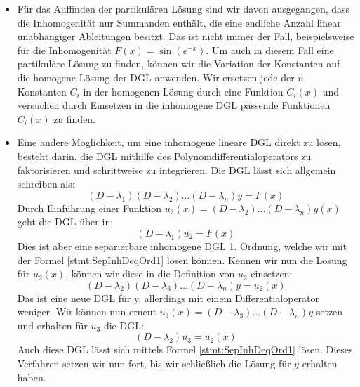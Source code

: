 \begin{itemize}
    \item Für das Auffinden der partikulären Lösung sind wir davon ausgegangen, dass die Inhomogenität nur Summanden enthält, die eine endliche Anzahl linear unabhängiger Ableitungen besitzt. Das ist nicht immer der Fall, beispielsweise für die Inhomogenität $F(x) = \sin(e^{-x})$. Um auch in diesem Fall eine partikuläre Lösung zu finden, können wir die Variation der Konstanten auf die homogene Lösung der DGL anwenden. Wir ersetzen jede der $n$ Konstanten $C_i$ in der homogenen Lösung durch eine Funktion $C_i(x)$ und versuchen durch Einsetzen in die inhomogene DGL passende Funktionen $C_i(x)$ zu finden.
    \item Eine andere Möglichkeit, um eine inhomogene lineare DGL direkt zu lösen, besteht darin, die DGL mithilfe des Polynomdifferentialoperators zu faktorisieren und schrittweise zu integrieren. Die DGL lässt sich allgemein schreiben als:
    $$
        (D-\lambda_1) (D-\lambda_2) \dots (D-\lambda_n) y = F(x)
    $$
    Durch Einführung einer Funktion $u_2(x) = (D-\lambda_2) \dots (D-\lambda_n) y(x)$ geht die DGL über in:
    $$
        (D-\lambda_1) u_2 = F(x)
    $$
    Dies ist aber eine separierbare inhomogene DGL 1. Ordnung, welche wir mit der Formel \ref{stmt:SepInhDeqOrd1} lösen können. Kennen wir nun die Lösung für $u_2(x)$, können wir diese in die Definition von $u_2$ einsetzen:
    $$
        (D-\lambda_2) (D-\lambda_3) \dots (D-\lambda_n) y = u_2(x)
    $$
    Das ist eine neue DGL für y, allerdings mit einem Differentialoperator weniger. Wir können nun erneut $u_3(x) = (D-\lambda_3) \dots (D-\lambda_n) y$ setzen und erhalten für $u_3$ die DGL:
    $$
        (D-\lambda_2) u_3 = u_2(x)
    $$
    Auch diese DGL lässt sich mittels Formel \ref{stmt:SepInhDeqOrd1} lösen. Dieses Verfahren setzen wir nun fort, bis wir schließlich die Lösung für $y$ erhalten haben.
\end{itemize}


